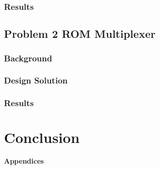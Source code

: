 \documentclass[11pt]{article}
\begin{document}
\subsubsection{Results}

\subsection{Problem 2 ROM Multiplexer}

\subsubsection{Background}

\subsubsection{Design Solution}

\subsubsection{Results}

\section{Conclusion}

\pagebreak

\textbf{Appendices}
\end{document}

